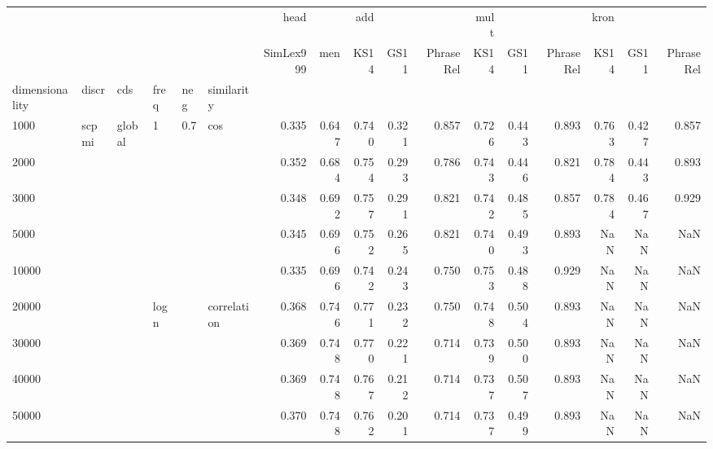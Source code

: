 \begin{tabular}{llllllrrrrrrrrrrr}
\toprule
      &       &        &   &     &             &      head &        &    add &        &           &   mult &        &           &   kron &        &           \\
      &       &        &   &     &             & SimLex999 &    men &   KS14 &   GS11 & PhraseRel &   KS14 &   GS11 & PhraseRel &   KS14 &   GS11 & PhraseRel \\
dimensionality & discr & cds & freq & neg & similarity &           &        &        &        &           &        &        &           &        &        &           \\
\midrule
1000  & scpmi & global & 1 & 0.7 & cos &     0.335 &  0.647 &  0.740 &  0.321 &     0.857 &  0.726 &  0.443 &     0.893 &  0.763 &  0.427 &     0.857 \\
2000  &       &        &   &     &             &     0.352 &  0.684 &  0.754 &  0.293 &     0.786 &  0.743 &  0.446 &     0.821 &  0.784 &  0.443 &     0.893 \\
3000  &       &        &   &     &             &     0.348 &  0.692 &  0.757 &  0.291 &     0.821 &  0.742 &  0.485 &     0.857 &  0.784 &  0.467 &     0.929 \\
5000  &       &        &   &     &             &     0.345 &  0.696 &  0.752 &  0.265 &     0.821 &  0.740 &  0.493 &     0.893 &    NaN &    NaN &       NaN \\
10000 &       &        &   &     &             &     0.335 &  0.696 &  0.742 &  0.243 &     0.750 &  0.753 &  0.488 &     0.929 &    NaN &    NaN &       NaN \\
20000 &       &        & logn &     & correlation &     0.368 &  0.746 &  0.771 &  0.232 &     0.750 &  0.748 &  0.504 &     0.893 &    NaN &    NaN &       NaN \\
30000 &       &        &   &     &             &     0.369 &  0.748 &  0.770 &  0.221 &     0.714 &  0.739 &  0.500 &     0.893 &    NaN &    NaN &       NaN \\
40000 &       &        &   &     &             &     0.369 &  0.748 &  0.767 &  0.212 &     0.714 &  0.737 &  0.507 &     0.893 &    NaN &    NaN &       NaN \\
50000 &       &        &   &     &             &     0.370 &  0.748 &  0.762 &  0.201 &     0.714 &  0.737 &  0.499 &     0.893 &    NaN &    NaN &       NaN \\
\bottomrule
\end{tabular}
